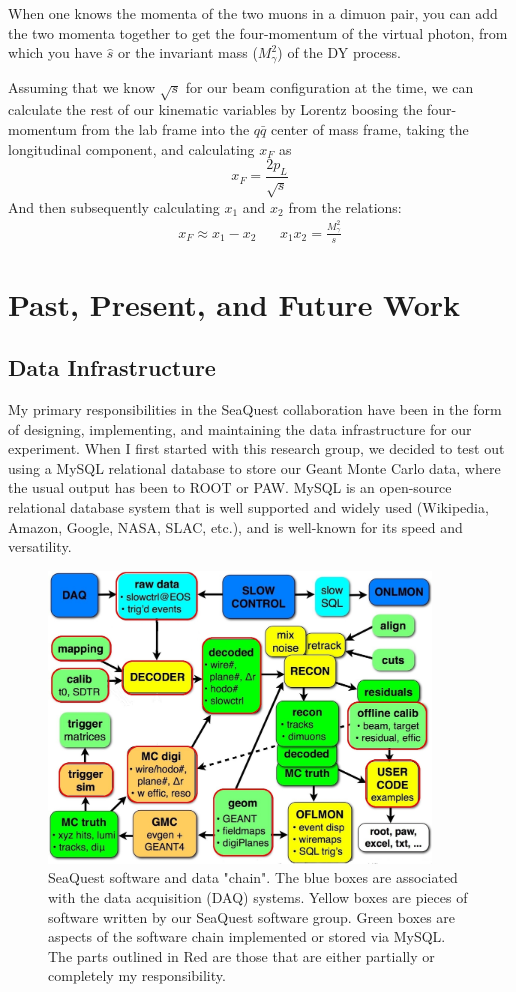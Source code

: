 \documentclass[11pt]{article}
\begin{document}
When one knows the momenta of the two muons in a dimuon pair, you can add the two momenta together to get the four-momentum of the virtual photon, from which you have $\hat{s}$ or the invariant mass ($M_\gamma^2$) of the DY process.

Assuming that we know $\sqrt{s}$ for our beam configuration at the time, we can calculate the rest of our kinematic variables by Lorentz boosing the four-momentum from the lab frame into the $q\bar{q}$ center of mass frame, taking the longitudinal component, and calculating $x_F$ as
\begin{equation}
x_F = \frac{2 p_L}{\sqrt{s}}
\end{equation}
And then subsequently calculating $x_1$ and $x_2$ from the relations:
\begin{eqnarray}
x_F \approx x_1-x_2  \; \; \; \; \; \;  x_1 x_2 = \frac{M_\gamma^2}{s}
\end{eqnarray}

\section{Past, Present, and Future Work}
\subsection{Data Infrastructure}
My primary responsibilities in the SeaQuest collaboration have been in the form of designing, implementing, and maintaining the data infrastructure for our experiment.  When I first started with this research group, we decided to test out using a MySQL relational database to store our Geant Monte Carlo data, where the usual output has been to ROOT or PAW.  MySQL is an open-source relational database system that is well supported and widely used (Wikipedia, Amazon, Google, NASA, SLAC, etc.), and is well-known for its speed and versatility.

 \begin{figure}
  \centerline{
    \mbox{\includegraphics[width=4.00in]{Softwarechain.jpg}}
  }
  \caption{SeaQuest software and data "chain".  The blue boxes are associated with the data acquisition (DAQ) systems. Yellow boxes are pieces of software written by our SeaQuest software group. Green boxes are aspects of the software chain implemented or stored via MySQL. The parts outlined in Red are those that are either partially or completely my responsibility.}
  \label{fig:softwarechain}
  \end{figure}
\end{document}

